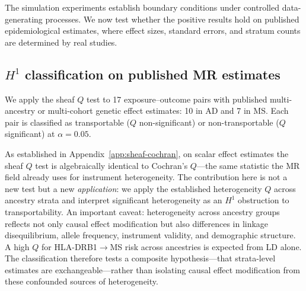 \documentclass{article}
\begin{document}
The simulation experiments establish boundary conditions under controlled data-generating processes. We now test whether the positive results hold on published epidemiological estimates, where effect sizes, standard errors, and stratum counts are determined by real studies.

\subsection{$H^1$ classification on published MR estimates}
\label{sec:realdata-h1}

We apply the sheaf $Q$ test to 17 exposure--outcome pairs with published multi-ancestry or multi-cohort genetic effect estimates: 10 in AD and 7 in MS. Each pair is classified as transportable ($Q$ non-significant) or non-transportable ($Q$ significant) at $\alpha = 0.05$.

As established in Appendix~\ref{app:sheaf-cochran}, on scalar effect estimates the sheaf $Q$ test is algebraically identical to Cochran's $Q$---the same statistic the MR field already uses for instrument heterogeneity.
The contribution here is not a new test but a new \emph{application}: we apply the established heterogeneity $Q$ across ancestry strata and interpret significant heterogeneity as an $H^1$ obstruction to transportability.
An important caveat: heterogeneity across ancestry groups reflects not only causal effect modification but also differences in linkage disequilibrium, allele frequency, instrument validity, and demographic structure.
A high $Q$ for HLA-DRB1$\to$MS risk across ancestries is expected from LD alone.
The classification therefore tests a composite hypothesis---that strata-level estimates are exchangeable---rather than isolating causal effect modification from these confounded sources of heterogeneity.
\end{document}
